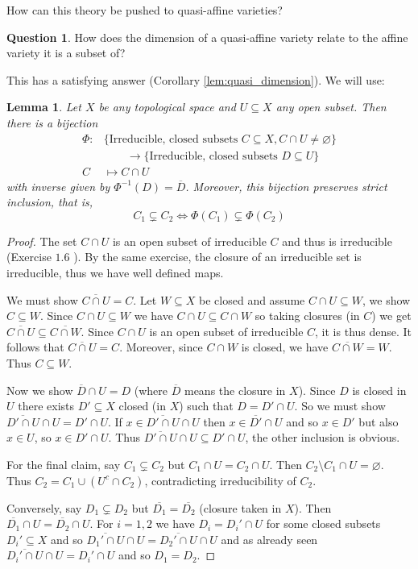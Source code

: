 \documentclass[12pt]{article}
\theoremstyle{plain}
\newtheorem{lemma}[thm]{Lemma}
\theoremstyle{definition}
\newtheorem{question}[thm]{Question}
\newcommand{\lto}{\longrightarrow}
\begin{document}
How can this theory be pushed to quasi-affine varieties?
\begin{question}\label{question:quasi}
How does the dimension of a quasi-affine variety relate to the affine variety it is a subset of?
\end{question}
This has a satisfying answer (Corollary \ref{lem:quasi_dimension}). We will use:
\begin{lemma}\label{lem:the_lemma_never_stated}
Let $X$ be any topological space and $U \subseteq X$ any open subset. Then there is a bijection
\begin{align}
    \Phi: &\lbrace \text{Irreducible, closed subsets }C \subseteq X, C \cap U \neq \varnothing \rbrace\\
    &\qquad\lto \lbrace \text{Irreducible, closed subsets }D \subseteq U\rbrace\\
    C &\longmapsto C \cap U
\end{align}
with inverse given by $\Phi^{-1}(D) = \overline{D}$. Moreover, this bijection preserves strict inclusion, that is,
\begin{equation}
    C_1 \subsetneq C_2 \Longleftrightarrow \Phi(C_1) \subsetneq \Phi(C_2)
\end{equation}
\end{lemma}
\begin{proof}
The set $C \cap U$ is an open subset of irreducible $C$ and thus is irreducible (Exercise $1.6$ \cite{hartshorne_solutions}). By the same exercise, the closure of an irreducible set is irreducible, thus we have well defined maps.

We must show $\overline{C \cap U} = C$. Let $W \subseteq X$ be closed and assume $C \cap U \subseteq W$, we show $C \subseteq W$. Since $C \cap U \subseteq W$ we have $C \cap U \subseteq C \cap W$ so taking closures (in $C$) we get $\overline{C \cap U} \subseteq \overline{C \cap W}$. Since $C \cap U$ is an open subset of irreducible $C$, it is thus dense. It follows that $\overline{C \cap U} = C$. Moreover, since $C \cap W$ is closed, we have $\overline{C \cap W} = W$. Thus $C \subseteq W$.

Now we show $\overline{D} \cap U = D$ (where $\overline{D}$ means the closure in $X$). Since $D$ is closed in $U$ there exists $D' \subseteq X$ closed (in $X$) such that $D = D' \cap U$. So we must show $\overline{D' \cap U} \cap U = D' \cap U$. If $x \in \overline{D' \cap U} \cap U$ then $x \in \overline{D'} \cap U$ and so $x \in D'$ but also $x \in U$, so $x \in D' \cap U$. Thus $\overline{D' \cap U} \cap U \subseteq D' \cap U$, the other inclusion is obvious.

For the final claim, say $C_1 \subsetneq C_2$ but $C_1 \cap U = C_2 \cap U$. Then $C_2\setminus C_1 \cap U = \varnothing$. Thus $C_2 = C_1 \cup (U^c \cap C_2)$, contradicting irreducibility of $C_2$.

Conversely, say $D_1 \subsetneq D_2$ but $\overline{D_1} = \overline{D_2}$ (closure taken in $X$). Then $\overline{D_1} \cap U = \overline{D_2} \cap U$. For $i=1,2$ we have $D_i = D_i' \cap U$ for some closed subsets $D_i' \subseteq X$ and so $\overline{D_1' \cap U} \cap U = \overline{D_2' \cap U} \cap U$ and as already seen $\overline{D_i' \cap U} \cap U = D_i' \cap U$ and so $D_1 = D_2$.
\end{proof}
\end{document}
